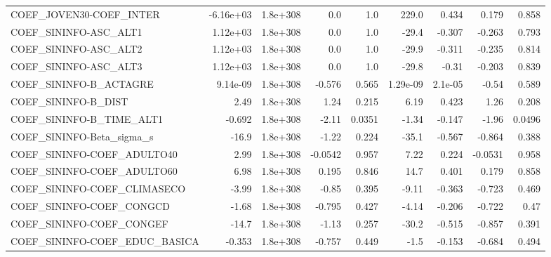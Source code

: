 \begin{tabular}{lrrrrrrrr}
COEF\_JOVEN30-COEF\_INTER           &   -6.16e+03 &     1.8e+308 &     0.0 &      1.0 &      229.0 &       0.434 &        0.179 &         0.858 \\
COEF\_SININFO-ASC\_ALT1             &    1.12e+03 &     1.8e+308 &     0.0 &      1.0 &      -29.4 &      -0.307 &       -0.263 &         0.793 \\
COEF\_SININFO-ASC\_ALT2             &    1.12e+03 &     1.8e+308 &     0.0 &      1.0 &      -29.9 &      -0.311 &       -0.235 &         0.814 \\
COEF\_SININFO-ASC\_ALT3             &    1.12e+03 &     1.8e+308 &     0.0 &      1.0 &      -29.8 &       -0.31 &       -0.203 &         0.839 \\
COEF\_SININFO-B\_ACTAGRE            &    9.14e-09 &     1.8e+308 &  -0.576 &    0.565 &   1.29e-09 &     2.1e-05 &        -0.54 &         0.589 \\
COEF\_SININFO-B\_DIST               &        2.49 &     1.8e+308 &    1.24 &    0.215 &       6.19 &       0.423 &         1.26 &         0.208 \\
COEF\_SININFO-B\_TIME\_ALT1          &      -0.692 &     1.8e+308 &   -2.11 &   0.0351 &      -1.34 &      -0.147 &        -1.96 &        0.0496 \\
COEF\_SININFO-Beta\_sigma\_s         &       -16.9 &     1.8e+308 &   -1.22 &    0.224 &      -35.1 &      -0.567 &       -0.864 &         0.388 \\
COEF\_SININFO-COEF\_ADULTO40        &        2.99 &     1.8e+308 & -0.0542 &    0.957 &       7.22 &       0.224 &      -0.0531 &         0.958 \\
COEF\_SININFO-COEF\_ADULTO60        &        6.98 &     1.8e+308 &   0.195 &    0.846 &       14.7 &       0.401 &        0.179 &         0.858 \\
COEF\_SININFO-COEF\_CLIMASECO       &       -3.99 &     1.8e+308 &   -0.85 &    0.395 &      -9.11 &      -0.363 &       -0.723 &         0.469 \\
COEF\_SININFO-COEF\_CONGCD          &       -1.68 &     1.8e+308 &  -0.795 &    0.427 &      -4.14 &      -0.206 &       -0.722 &          0.47 \\
COEF\_SININFO-COEF\_CONGEF          &       -14.7 &     1.8e+308 &   -1.13 &    0.257 &      -30.2 &      -0.515 &       -0.857 &         0.391 \\
COEF\_SININFO-COEF\_EDUC\_BASICA     &      -0.353 &     1.8e+308 &  -0.757 &    0.449 &       -1.5 &      -0.153 &       -0.684 &         0.494 \\

\end{tabular}
